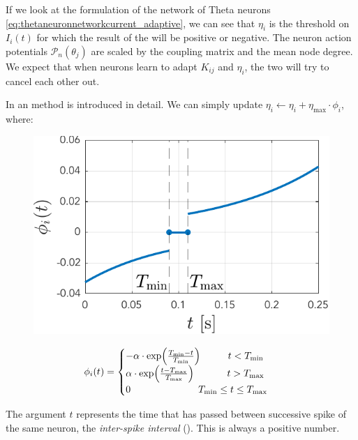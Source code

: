 If we look at the formulation of the network of Theta neurons \eqref{eq:thetaneuronnetworkcurrent_adaptive}, we can see that $\eta_i$ is the threshold on $I_i(t)$ for which the result of the \PRC will be positive or negative. The neuron action potentials $\mathcal{P}_n(\theta_j)$ are scaled by the coupling matrix and the mean node degree. We expect that when neurons learn to adapt $K_{ij}$ and $\eta_i$, the two will try to cancel each other out.

In \cite{Song2017} an \IP method is introduced in detail. We can simply update $\eta_{i} \leftarrow \eta_{i} + \eta_{\max } \cdot \phi_{i}$, where: 
\begin{minipage}{.45\textwidth}
   \centering
   \begin{figure}[H]
	\centering
	\includegraphics[width = \textwidth]{../Figures/Learning/IPlearningFunction.pdf}
	\label{fig:IPlearningFunction}
	\end{figure}
\end{minipage}
\begin{minipage}{.55\textwidth}
\begin{align}
	\phi_{i} (t) =
	\begin{cases}
	-\alpha \cdot \exp \left(\frac{T_{\min }-t}{T_{\rm min }}\right) \hspace{10mm} t<T_{ \rm min } \\ 
	\alpha \cdot \exp \left(\frac{t-T_{\rm max }}{T_{\max }}\right) \hspace{12mm} t >T_{\rm max } \\ 
	0 \hspace{24.5mm} T_{ \rm min } \leq t \leq T_{\rm max }
	\end{cases}
\end{align}
\vspace{10mm}
\end{minipage}
The argument $t$ represents the time that has passed between successive spike of the same neuron, the \textsl{inter-spike interval} (\ISI). This is always a positive number. \\

